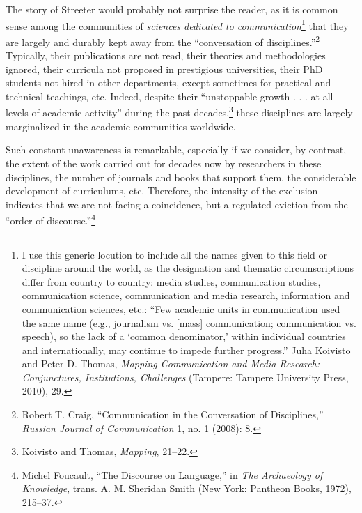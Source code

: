 \documentclass{tufte-handout}
\begin{document}
\enlargethispage{\baselineskip}

The story of Streeter would probably not surprise the reader, as it is
common sense among the communities of \emph{sciences dedicated to
communication}\footnote{I use this generic locution to include all the
  names given to this field or discipline around the world, as the
  designation and thematic circumscriptions differ from country to
  country: media studies, communication studies, communication science,
  communication and media research, information and communication
  sciences, etc.: ``Few academic units in communication used the same
  name (e.g., journalism vs. {[}mass{]} communication; communication vs.
  speech), so the lack of a `common denominator,' within individual
  countries and internationally, may continue to impede further
  progress.'' Juha Koivisto and Peter D. Thomas, \emph{Mapping
  Communication and Media Research: Conjunctures, Institutions,
  Challenges} (Tampere: Tampere University Press, 2010), 29.} that they
are largely and durably kept away from the ``conversation of
disciplines.''\footnote{Robert T. Craig, ``Communication in the
  Conversation of Disciplines,'' \emph{Russian Journal of Communication}
  1, no. 1 (2008): 8.} Typically, their publications are not read, their
theories and methodologies ignored, their curricula not proposed in
prestigious universities, their PhD students not hired in other
departments, except sometimes for practical and technical teachings,
etc. Indeed, despite their ``unstoppable growth . . . at all levels of
academic activity'' during the past decades,\footnote{Koivisto and
  Thomas, \emph{Mapping}, 21--22.} these disciplines are largely
marginalized in the academic communities worldwide.

Such constant unawareness is remarkable, especially if we consider, by
contrast, the extent of the work carried out for decades now by
researchers in these disciplines, the number of journals and books that
support them, the considerable development of curriculums, etc.
Therefore, the intensity of the exclusion indicates that we are not
facing a coincidence, but a regulated eviction from the ``order of
discourse.''\footnote{Michel Foucault, ``The Discourse on Language,'' in
  \emph{The Archaeology of Knowledge}, trans. A. M. Sheridan Smith (New
  York: Pantheon Books, 1972), 215--37.}
\end{document}
